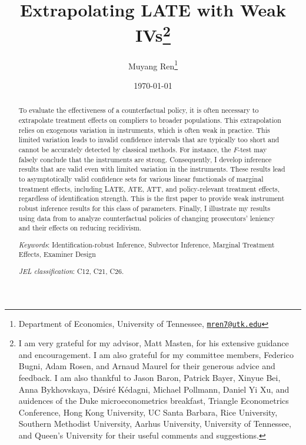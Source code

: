 \documentclass[11pt]{article}
\author{Muyang Ren\thanks{Department of Economics, University of Tennessee, \href{mailto:mren7@utk.edu}{\texttt{mren7@utk.edu}}}}
\title{\textbf{Extrapolating LATE with Weak IVs}\thanks{I am very grateful for my advisor, Matt Masten, for his extensive guidance and encouragement. I am also grateful for my committee members, Federico Bugni, Adam Rosen, and Arnaud Maurel for their generous advice and feedback. I am also thankful to Jason Baron, Patrick Bayer, Xinyue Bei, Anna Bykhovskaya, Désiré Kédagni, Michael Pollmann, Daniel Yi Xu, and auidences of the Duke microeconometrics breakfast, Triangle Econometrics Conference, Hong Kong University, UC Santa Barbara, Rice University, Southern Methodist University, Aarhus University, University of Tennessee, and Queen's University for their useful comments and suggestions.}}
\date{\today}
\theoremstyle{definition}
\newcommand{\0}{\ensuremath{\mathbf{0}}}
\begin{document}
\begin{bibunit}   %

\maketitle

\begin{abstract}
     To evaluate the effectiveness of a counterfactual policy, it is often necessary to extrapolate treatment effects on compliers to broader populations. This extrapolation relies on exogenous variation in instruments, which is often weak in practice. This limited variation leads to invalid confidence intervals that are typically too short and cannot be accurately detected by classical methods. For instance, the $F$-test may falsely conclude that the instruments are strong. Consequently, I develop inference results that are valid even with limited variation in the instruments. These results lead to asymptotically valid confidence sets for various linear functionals of marginal treatment effects, including LATE, ATE, ATT, and policy-relevant treatment effects, regardless of identification strength. This is the first paper to provide weak instrument robust inference results for this class of parameters. Finally, I illustrate my results using data from \cite{agan/doleac/harvey:2023} to analyze counterfactual policies of changing prosecutors' leniency and their effects on reducing recidivism.
    \begin{description}
    \medskip
    \item \textit{Keywords}:
    Identification-robust Inference, Subvector Inference, Marginal Treatment Effects, Examiner Design
    \medskip
    \item \textit{JEL classification}: C12, C21, C26.
    \end{description}
\end{abstract}


\doparttoc %
\faketableofcontents

\part{} %
%

\newpage



\end{bibunit}
\end{document}
